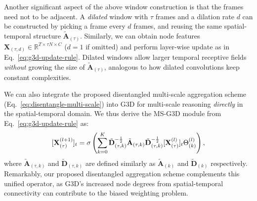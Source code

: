 \documentclass[10pt,twocolumn,letterpaper]{article}
\makeatletter
\renewcommand{\paragraph}{\@startsection{paragraph}{4}{\z@}{1.5ex \@plus 1ex \@minus .2ex}{-1em}{\normalfont\normalsize\bfseries}}
\makeatother
\begin{document}
Another significant aspect of the above window construction is that the frames need not to be adjacent. A \textit{dilated} window with $\tau$ frames and a dilation rate $d$ can be constructed by picking a frame every $d$ frames, and reusing the same spatial-temporal structure $\tilde{\mathbf{A}}_{(\tau)}$. Similarly, we can obtain node features $\mathbf{X}_{(\tau, d)} \in \mathbb{R}^{T\times \tau N \times C}$
($d=1$ if omitted) and perform layer-wise update as in Eq.~\ref{eq:g3d-update-rule}. Dilated windows allow larger temporal receptive fields \textit{without} growing the size of $\tilde{\mathbf{A}}_{(\tau)}$, analogous to how dilated convolutions \cite{dilated-conv} keep constant complexities.


\paragraph{Multi-Scale G3D.}
We can also integrate the proposed disentangled multi-scale aggregation scheme (Eq.~\ref{eq:disentangle-multi-scale}) into G3D for multi-scale reasoning \textit{directly} in the spatial-temporal domain.
We thus derive the MS-G3D module from Eq.~\ref{eq:g3d-update-rule} as:
\begin{equation} \label{eq:g3d-multi-scale}
\small [\mathbf{X}_{(\tau)}^{(l+1)}]_t =
    \sigma \left(
    \sum_{k=0}^{K}
        \tilde{\mathbf{D}}_{(\tau, k)}^{-\frac{1}{2}}
        \tilde{\mathbf{A}}_{(\tau, k)}
        \tilde{\mathbf{D}}_{(\tau, k)}^{-\frac{1}{2}}
        [\mathbf{X}_{(\tau)}^{(l)}]_t
        \Theta^{(l)}_{(k)}
    \right),
\end{equation}
where $\tilde{\mathbf{A}}_{(\tau, k)}$ and $\tilde{\mathbf{D}}_{(\tau, k)}$ are defined similarly as $\tilde{\mathbf{A}}_{(k)}$ and $\tilde{\mathbf{D}}_{(k)}$ respectively.
Remarkably, our proposed disentangled aggregation scheme complements this unified operator, as G3D's increased node degrees from spatial-temporal connectivity can contribute to the biased weighting problem.
\end{document}
